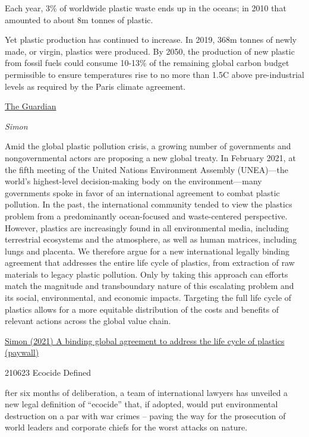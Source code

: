 \documentclass[
]{book}
\begin{document}
Each year, 3\% of worldwide plastic waste ends up in the oceans; in 2010 that amounted to about 8m tonnes of plastic.

Yet plastic production has continued to increase. In 2019, 368m tonnes of newly made, or virgin, plastics were produced. By 2050, the production of new plastic from fossil fuels could consume 10-13\% of the remaining global carbon budget permissible to ensure temperatures rise to no more than 1.5C above pre-industrial levels as required by the Paris climate agreement.

\href{https://www.theguardian.com/environment/2021/jul/01/call-for-global-treaty-to-end-production-of-virgin-plastic-by-2040}{The Guardian}

\emph{Simon}

Amid the global plastic pollution crisis, a growing number of governments and nongovernmental actors are proposing a new global treaty. In February 2021, at the fifth meeting of the United Nations Environment Assembly (UNEA)---the world's highest-level decision-making body on the environment---many governments spoke in favor of an international agreement to combat plastic pollution. In the past, the international community tended to view the plastics problem from a predominantly ocean-focused and waste-centered perspective. However, plastics are increasingly found in all environmental media, including terrestrial ecosystems and the atmosphere, as well as human matrices, including lungs and placenta. We therefore argue for a new international legally binding agreement that addresses the entire life cycle of plastics, from extraction of raw materials to legacy plastic pollution. Only by taking this approach can efforts match the magnitude and transboundary nature of this escalating problem and its social, environmental, and economic impacts. Targeting the full life cycle of plastics allows for a more equitable distribution of the costs and benefits of relevant actions across the global value chain.

\href{https://science.sciencemag.org/content/373/6550/43}{Simon (2021) A binding global agreement to address the life cycle of plastics (paywall)}

210623 Ecocide Defined

fter six months of deliberation, a team of international lawyers has unveiled a new legal definition of ``ecocide'' that, if adopted, would put environmental destruction on a par with war crimes -- paving the way for the prosecution of world leaders and corporate chiefs for the worst attacks on nature.
\end{document}
